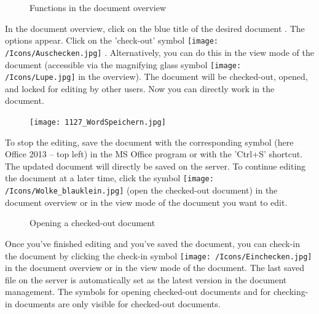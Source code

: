 \begin{figure}[H]
\caption{Functions in the document overview}
\end{figure}

In the document overview, click on the blue title of the desired document . The options appear. Click on the 'check-out' symbol \texttt{[image: /Icons/Auschecken.jpg]} . Alternatively, you can do this in the view mode of the document (accessible via the magnifying glass symbol \texttt{[image: /Icons/Lupe.jpg]}  in the overview). The document will be checked-out, opened, and locked for editing by other users. Now you can directly work in the document.

\begin{figure}
\vspace{-15pt}
\texttt{[image: 1127\_WordSpeichern.jpg]}
\end{figure}
To stop the editing, save the document with the corresponding symbol  (here Office 2013 -- top left) in the MS Office program or with the 'Ctrl+S' shortcut. The updated document will directly be saved on the server. To continue editing the document at a later time, click the symbol \texttt{[image: /Icons/Wolke\_blauklein.jpg]}  (open the checked-out document) in the document overview or in the view mode of the document you want to edit.

\begin{figure}[H]
\caption{Opening a checked-out document}
\end{figure}

Once you've finished editing and you've saved the document, you can check-in the document by clicking the check-in symbol \texttt{[image: /Icons/Einchecken.jpg]}  in the document overview or in the view mode of the document. The last saved file on the server is automatically set as the latest version in the document management. The symbols for opening checked-out documents and for checking-in documents are only visible for checked-out documents.

